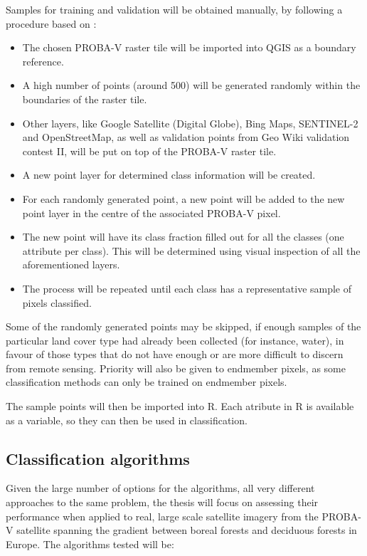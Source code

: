 \documentclass[a4paper,10pt]{article}
\begin{document}
Samples for training and validation will be obtained manually, by following a procedure based on \cite{defries1998training}:
\begin{itemize}
 \item The chosen PROBA-V raster tile will be imported into QGIS as a boundary reference.
 \item A high number of points (around 500) will be generated randomly within the boundaries of the raster tile.
 \item Other layers, like Google Satellite (Digital Globe), Bing Maps, SENTINEL-2 and OpenStreetMap, as well as validation points from Geo Wiki validation contest II, will be put on top of the PROBA-V raster tile.
 \item A new point layer for determined class information will be created.
 \item For each randomly generated point, a new point will be added to the new point layer in the centre of the associated PROBA-V pixel.
 \item The new point will have its class fraction filled out for all the classes (one attribute per class). This will be determined using visual inspection of all the aforementioned layers.
 \item The process will be repeated until each class has a representative sample of pixels classified.
\end{itemize}

Some of the randomly generated points may be skipped, if enough samples of the particular land cover type had already been collected (for instance, water), in favour of those types that do not have enough or are more difficult to discern from remote sensing. Priority will also be given to endmember pixels, as some classification methods can only be trained on endmember pixels.

The sample points will then be imported into R. Each atribute in R is available as a variable, so they can then be used in classification.

\subsection{Classification algorithms}

Given the large number of options for the algorithms, all very different approaches to the same problem, the thesis will focus on assessing their performance when applied to real, large scale satellite imagery from the PROBA-V satellite spanning the gradient between boreal forests and deciduous forests in Europe. The algorithms tested will be:
\end{document}
